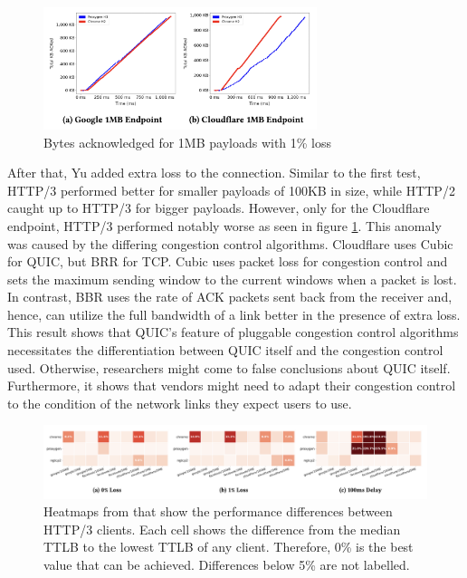 \documentclass[conference]{IEEEtran}
\begin{document}
\begin{figure}[htbp]
\includegraphics[width=8cm,keepaspectratio]{images/Yu2/Cloudflare anomaly.png}
\caption{Bytes acknowledged for 1MB payloads with 1\% loss \cite{Yu2}}
\label{fig:yu2-cloudflare-anomaly}
\end{figure}

After that, Yu added extra loss to the connection. Similar to the first test, HTTP/3 performed better for smaller payloads of 100KB in size, while HTTP/2 caught up to HTTP/3 for bigger payloads. However, only for the Cloudflare endpoint, HTTP/3 performed notably worse as seen in figure \ref{fig:yu2-cloudflare-anomaly}. This anomaly was caused by the differing congestion control algorithms. Cloudflare uses Cubic for QUIC, but BRR for TCP. Cubic uses packet loss for congestion control and sets the maximum sending window to the current windows when a packet is lost. In contrast, BBR uses the rate of ACK packets sent back from the receiver and, hence, can utilize the full bandwidth of a link better in the presence of extra loss. This result shows that QUIC's feature of pluggable congestion control algorithms necessitates the differentiation between QUIC itself and the congestion control used. Otherwise, researchers might come to false conclusions about QUIC itself. Furthermore, it shows that vendors might need to adapt their congestion control to the condition of the network links they expect users to use.

\begin{figure}[h]
\includegraphics[width=\textwidth,keepaspectratio]{images/Yu2/HTTP3 Single object benchmarks.png}
\caption{Heatmaps from \cite{Yu2} that show the performance differences between HTTP/3 clients. Each cell shows the difference from the median TTLB to the lowest TTLB of any client. Therefore, 0\% is the best value that can be achieved. Differences below 5\% are not labelled.}
\label{fig:yu2-http3-single-object-benchmark}
\end{figure}
\end{document}
